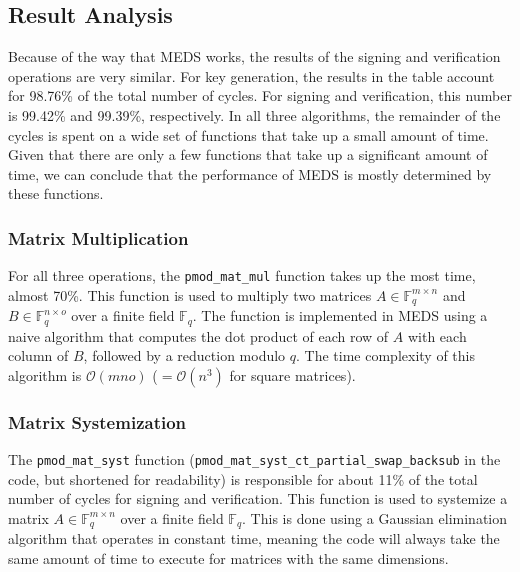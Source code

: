 \documentclass[11pt,a4paper]{report}
\theoremstyle{definition}
\begin{document}
\subsection{Result Analysis}
Because of the way that MEDS works, the results of the signing and verification operations are very similar. For key generation, the results in the table account for 98.76\% of the total number of cycles. For signing and verification, this number is 99.42\% and 99.39\%, respectively. In all three algorithms, the remainder of the cycles is spent on a wide set of functions that take up a small amount of time. Given that there are only a few functions that take up a significant amount of time, we can conclude that the performance of MEDS is mostly determined by these functions.

\subsubsection{Matrix Multiplication}
For all three operations, the \texttt{pmod\_mat\_mul} function takes up the most time, almost 70\%. This function is used to multiply two matrices $A \in \mathbb{F}_q^{m \times n}$ and $B \in \mathbb{F}_q^{n \times o}$ over a finite field $\mathbb{F}_q$. The function is implemented in MEDS using a naive algorithm that computes the dot product of each row of $A$ with each column of $B$, followed by a reduction modulo $q$. The time complexity of this algorithm is $\mathcal{O}(mno)$ ($= \mathcal{O}(n^3)$ for square matrices).

\subsubsection{Matrix Systemization}
The \texttt{pmod\_mat\_syst} function (\texttt{pmod\_mat\_syst\_ct\_partial\_swap\_backsub} in the code, but shortened for readability) is responsible for about 11\% of the total number of cycles for signing and verification. This function is used to systemize a matrix $A \in \mathbb{F}_q^{m \times n}$ over a finite field $\mathbb{F}_q$. This is done using a Gaussian elimination algorithm that operates in constant time, meaning the code will always take the same amount of time to execute for matrices with the same dimensions.
\end{document}
